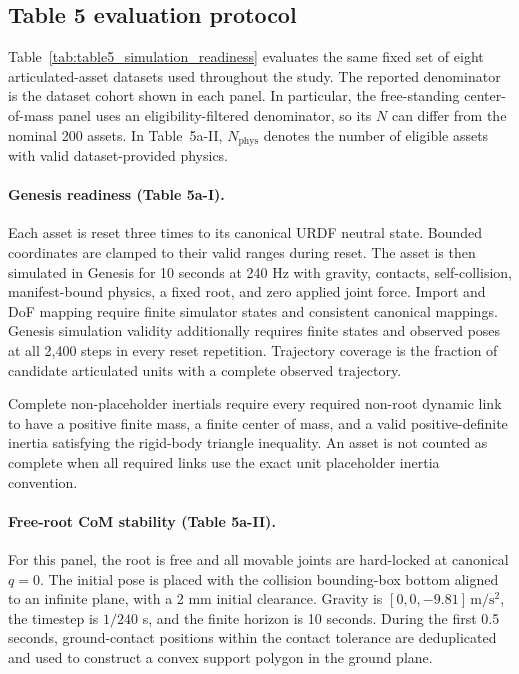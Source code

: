 
\subsection{Table 5 evaluation protocol}
\label{app:table5_protocol}

Table~\ref{tab:table5_simulation_readiness} evaluates the same fixed set of
eight articulated-asset datasets used throughout the study. The reported
denominator is the dataset cohort shown in each panel. In particular, the
free-standing center-of-mass panel uses an eligibility-filtered denominator,
so its $N$ can differ from the nominal 200 assets. In Table~5a-II,
$N_{\mathrm{phys}}$ denotes the number of eligible assets with valid
dataset-provided physics.

\paragraph{Genesis readiness (Table 5a-I).}
Each asset is reset three times to its canonical URDF neutral state. Bounded
coordinates are clamped to their valid ranges during reset. The asset is then
simulated in Genesis for 10 seconds at 240 Hz with gravity, contacts,
self-collision, manifest-bound physics, a fixed root, and zero applied joint
force. Import and DoF mapping require finite simulator states and consistent
canonical mappings. Genesis simulation validity additionally requires finite
states and observed poses at all 2,400 steps in every reset repetition.
Trajectory coverage is the fraction of candidate articulated units with a
complete observed trajectory.

Complete non-placeholder inertials require every required non-root dynamic link
to have a positive finite mass, a finite center of mass, and a valid
positive-definite inertia satisfying the rigid-body triangle inequality. An
asset is not counted as complete when all required links use the exact unit
placeholder inertia convention.

\paragraph{Free-root CoM stability (Table 5a-II).}
For this panel, the root is free and all movable joints are hard-locked at
canonical $q=0$. The initial pose is placed with the collision bounding-box
bottom aligned to an infinite plane, with a 2 mm initial clearance. Gravity is
$[0,0,-9.81]\,\mathrm{m/s^2}$, the timestep is $1/240$ s, and the finite
horizon is 10 seconds. During the first 0.5 seconds, ground-contact positions
within the contact tolerance are deduplicated and used to construct a convex
support polygon in the ground plane.

